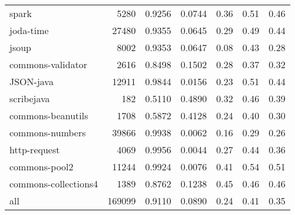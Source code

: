 \begin{table*}
\begin{tabular}{lrrrrrr}
                  spark &    5280 &          0.9256 &          0.0744 &         0.36 &         0.51 &             0.46 \\
              joda-time &   27480 &          0.9355 &          0.0645 &         0.29 &         0.49 &             0.44 \\
                  jsoup &    8002 &          0.9353 &          0.0647 &         0.08 &         0.43 &             0.28 \\
      commons-validator &    2616 &          0.8498 &          0.1502 &         0.28 &         0.37 &             0.32 \\
              JSON-java &   12911 &          0.9844 &          0.0156 &         0.23 &         0.51 &             0.44 \\
             scribejava &     182 &          0.5110 &          0.4890 &         0.32 &         0.46 &             0.39 \\
      commons-beanutils &    1708 &          0.5872 &          0.4128 &         0.24 &         0.40 &             0.30 \\
        commons-numbers &   39866 &          0.9938 &          0.0062 &         0.16 &         0.29 &             0.26 \\
           http-request &    4069 &          0.9956 &          0.0044 &         0.27 &         0.44 &             0.36 \\
          commons-pool2 &   11244 &          0.9924 &          0.0076 &         0.41 &         0.54 &             0.51 \\
   commons-collections4 &    1389 &          0.8762 &          0.1238 &         0.45 &         0.46 &             0.46 \\
                    all &  169099 &          0.9110 &          0.0890 &         0.24 &         0.41 &             0.35 \\
\bottomrule
\end{tabular}
\end{table*}
